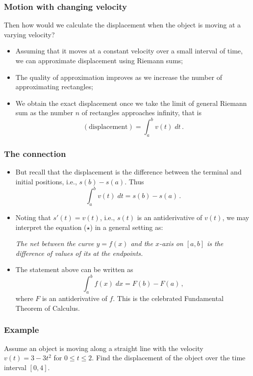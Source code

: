 \documentclass[10pt,t,handout,ignorenonframetext,aspectratio=169]{beamer}
\begin{document}
\begin{frame}
  \frametitle{Motion with changing velocity}
  Then how would we calculate the displacement when the
  object is moving at a varying velocity?

  \begin{itemize}
  \item Assuming that it moves at a constant velocity over a small
    interval of time, we can approximate displacement using Riemann
    sums;
  \item The quality of approximation improves as we increase the number of
    approximating rectangles;
  \item We obtain the exact displacement once
    we take the limit of general Riemann sum as the number $n$ of
    rectangles approaches infinity, that is
    \[
      (\text{displacement})
      =  \int_a^b v(t) \; dt \,. \tag{variable velocity}
    \]
  \end{itemize}
\end{frame}

\begin{frame}
  \frametitle{The connection}
  \begin{itemize}
  \item   But recall that the displacement is the difference between the
    terminal and initial positions, i.e., $s(b)-s(a)$. Thus
    \[
      \int_a^b v(t) \; dt = s(b) - s(a) \,. \tag{$\star$}
    \]
  \item   Noting that $s'(t) = v(t)$, i.e., $s(t)$ is an antiderivative of
    $v(t)$, we may interpret the equation ($\star$) in a general setting
    as:
    \vspace{0.5em}
    \begin{center}
      \begin{minipage}{0.9\linewidth}
        \textit{
          The net  between the curve $y = f(x)$ and the $x$-axis on $[a,
          b]$ is the difference of values of its  at the endpoints.
        }
      \end{minipage}
    \end{center}
    \vspace{0.5em}
  \item The statement above can be written as
    \[
      \int_a^b f(x) \; dx = F(b) - F(a) \,,
    \]
    where $F$ is an antiderivative of $f$. This is the celebrated
    Fundamental Theorem of Calculus.
  \end{itemize}
\end{frame}

\begin{frame}
  \frametitle{Example}
  \begin{question}
    Assume an object is moving along a straight line with the velocity
    $v(t) = 3 - 3t^2$ for $0 \le t \le 2$. Find the displacement of the
    object over the time interval $[0, 4]$.
  \end{question}
\end{frame}
\end{document}
